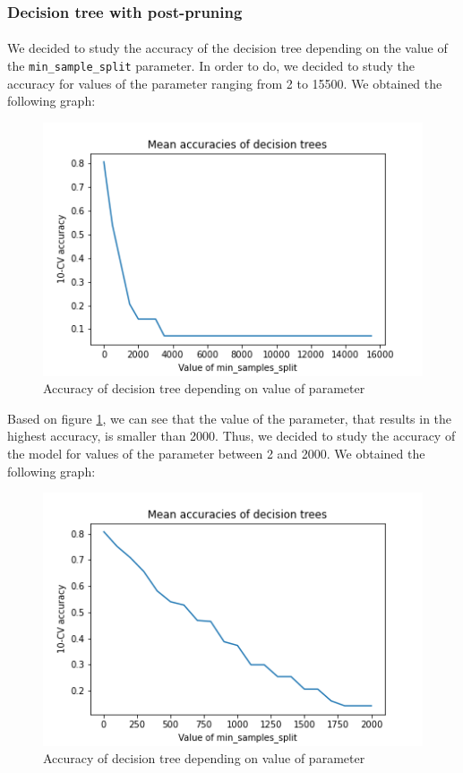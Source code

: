 \documentclass[a4paper, 11pt, oneside]{article}
\begin{document}
\subsubsection{Decision tree with post-pruning}
\paragraph{}We decided to study the accuracy of the decision tree depending on the value of the \texttt{min\_sample\_split} parameter. In order to do, we decided to study the accuracy for values of the parameter ranging from 2 to 15500. We obtained the following graph:
\begin{figure}[H]
\centering
\includegraphics[scale=0.4]{dt/dt_basic_accuracies_1.png}
\caption{Accuracy of decision tree depending on value of parameter}
\label{fig:dt_acc_1}
\end{figure}
Based on figure \ref{fig:dt_acc_1}, we can see that the value of the parameter, that results in the highest accuracy, is smaller than 2000. Thus, we decided to study the accuracy of the model for values of the parameter between 2 and 2000. We obtained the following graph:
\begin{figure}[H]
\centering
\includegraphics[scale=0.4]{dt/dt_basic_accuracies_2.png}
\caption{Accuracy of decision tree depending on value of parameter}
\end{figure}
\end{document}
